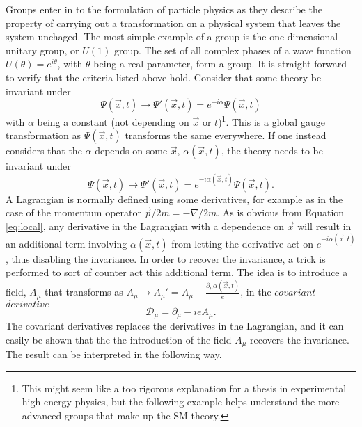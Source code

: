 Groups enter in to the formulation of particle physics as they describe the property of carrying out a transformation on a physical system that leaves the system unchaged. 
The most simple example of a group is the one dimensional unitary group, or $U(1)$ group. 
The set of all complex phases of a wave function $U(\theta)=e^{i\theta}$, with $\theta$ being a real parameter, form a group.
It is straight forward to verify that the criteria listed above hold. 
Consider that some theory be invariant under 
\begin{equation}
\Psi(\vec{x},t)\rightarrow \Psi'(\vec{x},t)=e^{-i\alpha}\Psi(\vec{x},t)
\end{equation}                                                         
with $\alpha$ being a constant (not depending on $\vec{x}$ or $t$)\footnote{This might seem like a too rigorous explanation for a thesis in experimental high energy physics, but the following example helps understand the more advanced groups that make up the SM theory.}. 
This is a global gauge transformation as $\Psi(\vec{x},t)$ transforms the same everywhere.  
If one instead considers that the $\alpha$ depends on some $\vec{x}$, $\alpha(\vec{x},t)$, the theory needs to be invariant under 
\begin{equation}
\Psi(\vec{x},t)\rightarrow \Psi'(\vec{x},t)=e^{-i\alpha(\vec{x},t)}\Psi(\vec{x},t). 
\label{eq:local}
\end{equation}                                                         
A Lagrangian is normally defined using some derivatives, for example as in the case of the momentum operator $\vec{p}/2m=-\nabla/2m$. 
As is obvious from Equation \ref{eq:local}, any derivative in the Lagrangian with a dependence on $\vec{x}$ will result in an additional term involving $\alpha(\vec{x},t)$ from letting the derivative act on $e^{-i\alpha(\vec{x},t)}$, thus disabling the invariance.
In order to recover the invariance, a trick is performed to sort of counter act this additional term. 
The idea is to introduce a field, $A_{\mu}$ that transforms as $A_{\mu}\rightarrow A_{\mu}'=A_{\mu}-\frac{\partial_{\mu}\alpha(\vec{x},t)}{e}$, in the $covariant$ $derivative$
\begin{equation}
\mathcal{D}_{\mu}=\partial_{\mu}-ieA_{\mu}.
\end{equation}                                                         
The covariant derivatives replaces the derivatives in the Lagrangian, and it can easily be shown that the the introduction of the field $A_{\mu}$ recovers the invariance. 
The result can be interpreted in the following way. 
